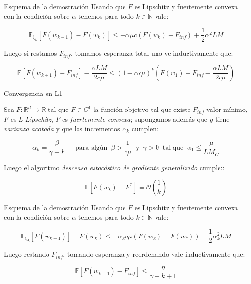 \documentclass{beamer}
\newcommand{\R}{{\mathbb{R}}}
\newcommand{\N}{{\mathbb{N}}}
\newcommand{\expectation}[1]{\mathbb{E} \left[#1\right]}
\newcommand{\expectationsub}[2]{\mathbb{E}_{#1} \left[#2\right]}
\newcommand{\expectationchik}[1]{\expectationsub{\upxi_{k}}{#1}}
\begin{document}
\begin{frame}{Esquema de la demostraci\'on}
	Usando que $F$ es Lipschitz y fuertemente convexa con la condici\'on sobre $\alpha$ tenemos para todo $k \in \N$ vale:

\begin{equation*}
\expectationchik{F(w_{k+1}) - F(w_k)} \leq - \alpha \mu c \left(F(w_k) - F_{inf} \right)+ \frac{1}{2} \alpha ^2 LM 
\end{equation*}

Luego si restamos $F_{inf}$, tomamos esperanza total uno ve inductivamente que:

\begin{equation*}
\expectation{F(w_{k+1}) - F_{inf}} - \dfrac{\alpha L M}{2 c \mu } \leq \left(1 - \alpha c \mu \right)^{k} \left(F(w_1) - F_{inf} - \dfrac{\alpha LM}{2 c \mu} \right)
\end{equation*}
\end{frame}

\begin{frame}{Convergencia en L1}

\begin{theorem}
	Sea $F: \R^d \rightarrow \R$ tal que $F \in C^1$ la funci\'on objetivo tal que existe $F_{inf}$ valor m\'inimo, $F$ es \textit{L-Lipschitz}, $F$ es \textit{fuertemente convexa}; supongamos adem\'as que $g$ tiene \textit{varianza acotada} y que los incrementos $\alpha_k$ cumplen:
	
	\begin{equation*}
	\alpha_k =  \dfrac{\beta}{\gamma + k} \quad \ \text{ para alg\'un } \ \beta > \frac{1}{c \mu} \  \text{ y } \ \gamma > 0 \  \text{ tal que } \ \alpha_1 \leq \dfrac{\mu}{L M_G} 
	\end{equation*}
	
	Luego el algoritmo \textit{descenso estoc\'astico de gradiente generalizado} cumple::
	
	\begin{equation*}
	\expectation{F(w_k) - F^*} = \mathcal{O} \left(\frac{1}{k}\right)
	\end{equation*}
	
\end{theorem}
\end{frame}

\begin{frame}{Esquema de la demostraci\'on}
	Usando que $F$ es Lipschitz y fuertemente convexa con la condici\'on sobre $\alpha$ tenemos para todo $k \in \N$ vale:

\begin{equation*}
\expectationchik{F(w_{k+1})} - F(w_k) \leq  - \alpha_k c \mu \left(F(w_k) - F(w_*)\right) + \frac{1}{2} \alpha_k^2 L M
\end{equation*}

Luego restando $F_{inf}$, tomando esperanza y reordenando vale inductivamente que:

\begin{equation*}
\expectation{F(w_{k+1}) - F_{inf}} \leq \dfrac{\eta}{\gamma + k + 1}
\end{equation*}
\end{frame}
\end{document}
